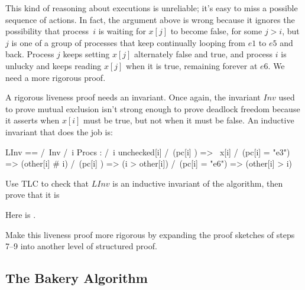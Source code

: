 \documentclass[fleqn,leqno]{article}
\begin{document}
This kind of reasoning about executions is unreliable; it's easy to
miss a possible sequence of actions.  In fact, the argument above is
wrong because it ignores the possibility that process~$i$ is waiting
for $x[j]$ to become false, for some $j>i$, but $j$ is one of a group
of processes that keep continually looping from $e1$ to $e5$ and back.
Process $j$ keeps setting $x[j]$ alternately false and true, and
process $i$ is unlucky and keeps reading $x[j]$ when it is true,
remaining forever at $e6$.  We need a more rigorous proof.

A rigorous liveness proof needs an invariant.  Once again, the
invariant $Inv$ used to prove mutual exclusion isn't strong enough to
prove deadlock freedom because it asserts when $x[i]$ must be true,
but not when it must be false.  An inductive invariant that does the
job is:
\begin{display}
\begin{notla}
LInv == /\ Inv
        /\ \A i \in Procs : 
              /\ i \notin unchecked[i]
              /\ (pc[i] ) => ~x[i]
              /\ (pc[i] = "e3") => (other[i] # i)
              /\ (pc[i] ) => (i > other[i])
              /\ (pc[i] = "e6") => (other[i] > i)
\end{notla}
\begin{tlatex}
%
%
%
\end{tlatex}
\end{display}
\begin{question}
Use TLC to check that $LInv$ is an inductive invariant of the algorithm, then
prove that it is
\end{question}
Here is
  .
\begin{question}
Make this liveness proof more rigorous by expanding the proof sketches
of steps 7--9 into another level of structured proof.
\end{question}


\subsection{The Bakery Algorithm}
\end{document}
